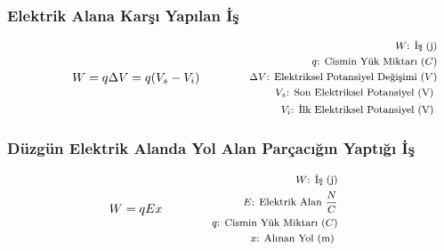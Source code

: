 \subsubsection*{Elektrik Alana Karşı Yapılan İş}
\begin{equation}
    W = q \Delta V = q (V_s - V_i) \qquad \qquad \parbox{4cm}{\footnotesize$\begin{aligned}
        W\text{: İş (j)} \\
        q\text{: Cismin Yük Miktarı } (C) \\
        \Delta V\text{: Elektriksel Potansiyel Değişimi } (V) \\
        V_s\text{: Son Elektriksel Potansiyel (V) } \\
        V_i\text{: İlk Elektriksel Potansiyel (V) }
\end{aligned}$}
\end{equation}

\subsubsection*{Düzgün Elektrik Alanda Yol Alan Parçacığın Yaptığı İş}
\begin{equation}
    W = qEx\qquad \qquad \parbox{4cm}{\footnotesize$\begin{aligned}
        W\text{: İş (j)} \\
        E\text{: Elektrik Alan } \frac{N}{C} \\
        q\text{: Cismin Yük Miktarı } (C) \\
        x\text{: Alınan Yol (m) }
\end{aligned}$}
\end{equation}

